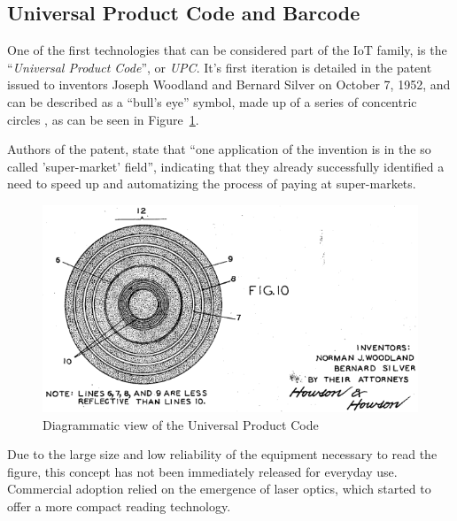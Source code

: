 	
	\subsection{Universal Product Code and Barcode}

		One of the first technologies that can be considered part of the IoT family, is the ``\textit{Universal Product Code}'', or \textit{UPC}.
		It's first iteration is detailed in the patent issued to inventors Joseph Woodland and Bernard Silver on October 7, 1952, and can be described as a ``bull's eye'' symbol, made up of a series of concentric circles \cite{upc_patent}, as can be seen in Figure~\ref{fig:upc_patent}.
		
		Authors of the patent, state  that ``one application of the invention is in the so called 'super-market' field'', indicating that they already successfully identified a need to speed up and automatizing the process of paying at super-markets.
		
		\begin{figure}[h!]
			\centering
			\includegraphics[width=\textwidth-4cm]{resources/img/upc_1}
			\caption{Diagrammatic view of the Universal Product Code}
			\label{fig:upc_patent}
		\end{figure}
		
		Due to the large size and low reliability of the equipment necessary to read the figure, this concept has not been immediately released for everyday use.
		Commercial adoption relied on the emergence of laser optics, which started to offer a more compact reading technology.
		
